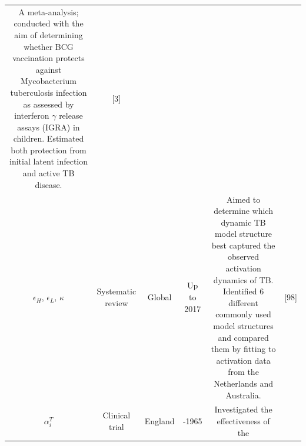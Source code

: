 \documentclass[11pt,twoside]{bristolthesis}
\begin{document}
\begin{longtable}[]{@{}cccccc@{}}
\begin{minipage}[t]{0.27\columnwidth}
  A meta-analysis; conducted with the aim
  of determining whether BCG vaccination
  protects against Mycobacterium
  tuberculosis infection as assessed by
  interferon \(\gamma\) release assays
  (IGRA) in children. Estimated both
  protection from initial latent infection
  and active TB disease.\strut
  \end{minipage} & \begin{minipage}[t]{0.11\columnwidth}\centering
  {[}3{]}\strut
  \end{minipage}\tabularnewline
  \begin{minipage}[t]{0.21\columnwidth}\centering
  \(\epsilon_H\),
  \(\epsilon_L\),
  \(\kappa\)\strut
  \end{minipage} & \begin{minipage}[t]{0.10\columnwidth}\centering
  Systematic
  review\strut
  \end{minipage} & \begin{minipage}[t]{0.07\columnwidth}\centering
  Global\strut
  \end{minipage} & \begin{minipage}[t]{0.07\columnwidth}\centering
  Up to
  2017\strut
  \end{minipage} & \begin{minipage}[t]{0.27\columnwidth}\centering
  Aimed to determine which dynamic TB
  model structure best captured the
  observed activation dynamics of TB.
  Identified 6 different commonly used
  model structures and compared them by
  fitting to activation data from the
  Netherlands and Australia.\strut
  \end{minipage} & \begin{minipage}[t]{0.11\columnwidth}\centering
  {[}98{]}\strut
  \end{minipage}\tabularnewline
  \begin{minipage}[t]{0.21\columnwidth}\centering
  \(\alpha_i^T\)\strut
  \end{minipage} & \begin{minipage}[t]{0.10\columnwidth}\centering
  Clinical
  trial\strut
  \end{minipage} & \begin{minipage}[t]{0.07\columnwidth}\centering
  England\strut
  \end{minipage} & \begin{minipage}[t]{0.07\columnwidth}\centering
  1950-1965\strut
  \end{minipage} & \begin{minipage}[t]{0.27\columnwidth}\centering
  Investigated the effectiveness of the

\end{minipage}
\end{longtable}
\end{document}
